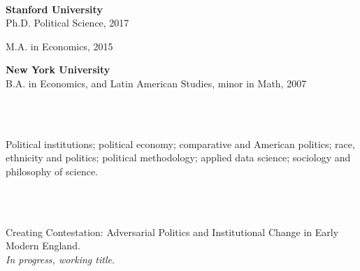 \documentclass[11pt]{article}
\begin{document}
\vspace{.3in}
\begin{minipage}[t]{.21\textwidth}
	\flushright
	 \hspace*{.2in}  \\
\end{minipage}
\begin{minipage}[t]{.79\textwidth}
	\textbf{Stanford University} \\
		\hspace*{.15in}Ph.D. Political Science,  2017 \\
		\vspace{-.2in}

	 	\hspace*{.15in}M.A. in Economics, 2015 \\
		\vspace{-.1in}

	\textbf{New York University} \\
		\hspace*{.15in}B.A. in Economics, and Latin American Studies, minor in Math,  2007 \\
\end{minipage}




\vspace{.3in}
\begin{minipage}[t]{.21\textwidth}
	\flushright
	 \hspace*{.2in}  \\
	 \hspace*{.2in}  \\
\end{minipage}
\begin{minipage}[t]{.79\textwidth}
	Political institutions; political economy; comparative and American
	politics; race, ethnicity and politics; political methodology; applied data science; sociology and philosophy of science. \\
\end{minipage}


\vspace{.3in}
\begin{minipage}[t]{.21\textwidth}
	\flushright
	 \hspace*{.2in}  \\
	 \hspace*{.2in}  \\
\end{minipage}
\begin{minipage}[t]{.79\textwidth}
		Creating Contestation: Adversarial Politics and Institutional Change in Early Modern England.  \\
		\emph{In progress, working title}. \\
\end{minipage}
\end{document}
